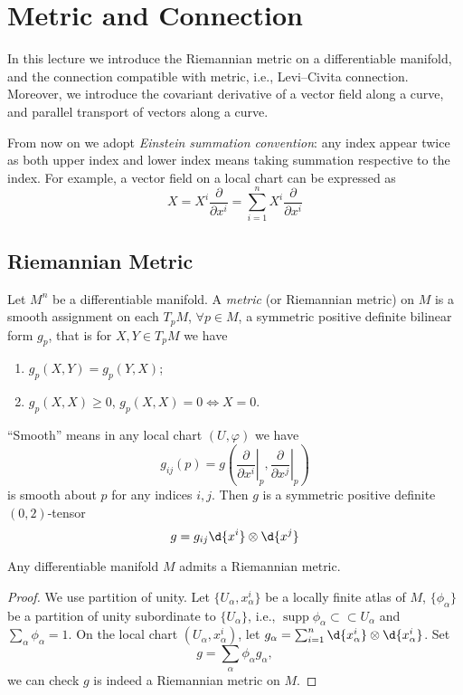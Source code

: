 \chapter{Metric and Connection}

In this lecture we introduce the Riemannian metric on a differentiable manifold, and the connection compatible with metric, i.e., Levi--Civita connection.
Moreover, we introduce the covariant derivative of a vector field along a curve, and parallel transport of vectors along a curve.

\begin{symb}
    From now on we adopt \emph{Einstein summation convention}:
    any index appear twice as both upper index and lower index means taking summation respective to the index.
    For example, a vector field on a local chart can be expressed as
    \[X=X^i\frac{\partial{}}{\partial{x^i}}=\sum_{i=1}^nX^i\frac{\partial{}}{\partial{x^i}}\]
\end{symb}

\section{Riemannian Metric}

\begin{defn}
    Let $M^n$ be a differentiable manifold.
    A \emph{metric} (or Riemannian metric) on $M$ is a smooth assignment on each $T_pM$, $\forall p\in M$, a symmetric positive definite bilinear form $g_p$, that is for $X,Y\in T_pM$ we have
    \begin{enumerate}
        \item $g_p(X,Y)=g_p(Y,X)$;
        \item $g_p(X,X)\geq 0$, $g_p(X,X)=0\iff X=0$.
    \end{enumerate}
    ``Smooth'' means in any local chart $(U,\varphi)$ we have
    \[g_{ij}(p)=g\left(\left.\frac{\partial{}}{\partial{x^i}}\right|_p,\left.\frac{\partial{}}{\partial{x^j}}\right|_p\right)\]
    is smooth about $p$ for any indices $i,j$.
    Then $g$ is a symmetric positive definite $(0,2)$-tensor
    \[g=g_{ij}\d{x^i}\otimes\d{x^j}\]
\end{defn}

\begin{prop}
    Any differentiable manifold $M$ admits a Riemannian metric.
\end{prop}
\begin{proof}
    We use partition of unity.
    Let $\{U_\alpha,x_\alpha^i\}$ be a locally finite atlas of $M$, $\{\phi_\alpha\}$ be a partition of unity subordinate to $\{U_\alpha\}$, i.e., $\operatorname{supp}\phi_\alpha\subset\subset U_\alpha$ and $\sum_\alpha\phi_\alpha=1$.
    On the local chart $(U_\alpha,x_\alpha^i)$, let $g_\alpha=\sum_{i=1}^n\d{x_\alpha^i}\otimes\d{x_\alpha^i}$.
    Set
    \[g=\sum_{\alpha}\phi_\alpha g_\alpha,\]
    we can check $g$ is indeed a Riemannian metric on $M$.
\end{proof}

